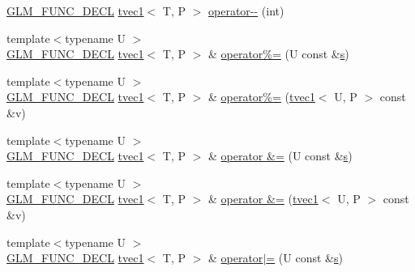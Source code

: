 \begin{DoxyCompactItemize}
\item 
\hyperlink{setup_8hpp_ab2d052de21a70539923e9bcbf6e83a51}{G\+L\+M\+\_\+\+F\+U\+N\+C\+\_\+\+D\+E\+CL} \hyperlink{structglm_1_1detail_1_1tvec1}{tvec1}$<$ T, P $>$ \hyperlink{structglm_1_1detail_1_1tvec1_a6fab4adec100e472d3b3d7da65ef2053}{operator-\/-\/} (int)
\item 
{\footnotesize template$<$typename U $>$ }\\\hyperlink{setup_8hpp_ab2d052de21a70539923e9bcbf6e83a51}{G\+L\+M\+\_\+\+F\+U\+N\+C\+\_\+\+D\+E\+CL} \hyperlink{structglm_1_1detail_1_1tvec1}{tvec1}$<$ T, P $>$ \& \hyperlink{structglm_1_1detail_1_1tvec1_a744a1362b6f4f9814ac695f7790b3fbf}{operator\%=} (U const \&\hyperlink{structglm_1_1detail_1_1tvec1_a1025b03a3e1f99c7a42518af40737d7b}{s})
\item 
{\footnotesize template$<$typename U $>$ }\\\hyperlink{setup_8hpp_ab2d052de21a70539923e9bcbf6e83a51}{G\+L\+M\+\_\+\+F\+U\+N\+C\+\_\+\+D\+E\+CL} \hyperlink{structglm_1_1detail_1_1tvec1}{tvec1}$<$ T, P $>$ \& \hyperlink{structglm_1_1detail_1_1tvec1_a99b8f92366abc26677caf3ad5befb4a2}{operator\%=} (\hyperlink{structglm_1_1detail_1_1tvec1}{tvec1}$<$ U, P $>$ const \&v)
\item 
{\footnotesize template$<$typename U $>$ }\\\hyperlink{setup_8hpp_ab2d052de21a70539923e9bcbf6e83a51}{G\+L\+M\+\_\+\+F\+U\+N\+C\+\_\+\+D\+E\+CL} \hyperlink{structglm_1_1detail_1_1tvec1}{tvec1}$<$ T, P $>$ \& \hyperlink{structglm_1_1detail_1_1tvec1_a386c71e88fa7f7e591a98d790b1a0ed5}{operator \&=} (U const \&\hyperlink{structglm_1_1detail_1_1tvec1_a1025b03a3e1f99c7a42518af40737d7b}{s})
\item 
{\footnotesize template$<$typename U $>$ }\\\hyperlink{setup_8hpp_ab2d052de21a70539923e9bcbf6e83a51}{G\+L\+M\+\_\+\+F\+U\+N\+C\+\_\+\+D\+E\+CL} \hyperlink{structglm_1_1detail_1_1tvec1}{tvec1}$<$ T, P $>$ \& \hyperlink{structglm_1_1detail_1_1tvec1_a4f2e9381b9289f4a4977801faf9b2bbb}{operator \&=} (\hyperlink{structglm_1_1detail_1_1tvec1}{tvec1}$<$ U, P $>$ const \&v)
\item 
{\footnotesize template$<$typename U $>$ }\\\hyperlink{setup_8hpp_ab2d052de21a70539923e9bcbf6e83a51}{G\+L\+M\+\_\+\+F\+U\+N\+C\+\_\+\+D\+E\+CL} \hyperlink{structglm_1_1detail_1_1tvec1}{tvec1}$<$ T, P $>$ \& \hyperlink{structglm_1_1detail_1_1tvec1_a879683e788198a53a1c4661a1b5af383}{operator$\vert$=} (U const \&\hyperlink{structglm_1_1detail_1_1tvec1_a1025b03a3e1f99c7a42518af40737d7b}{s})

\end{DoxyCompactItemize}
